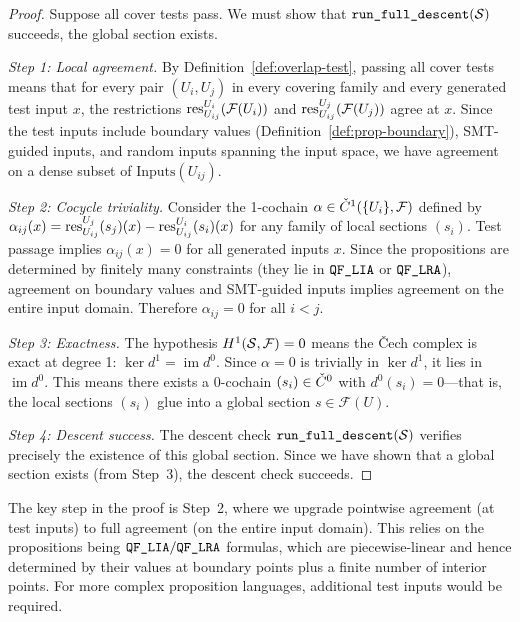 \documentclass[11pt]{article}
\newcommand{\RunDescent}{\texttt{run\_full\_descent}}
\begin{document}
\begin{proof}
Suppose all cover tests pass.  We must show that $\RunDescent(\Site)$
succeeds, \ie the global section exists.

\emph{Step 1: Local agreement.}
By Definition~\ref{def:overlap-test}, passing all cover tests means that
for every pair $(U_i, U_j)$ in every covering family and every generated
test input $x$, the restrictions $\mathrm{res}_{U_{ij}}^{U_i}(\mathcal{F}(U_i))$
and $\mathrm{res}_{U_{ij}}^{U_j}(\mathcal{F}(U_j))$ agree at $x$.  Since the
test inputs include boundary values (Definition~\ref{def:prop-boundary}),
SMT-guided inputs, and random inputs spanning the input space, we have
agreement on a dense subset of $\mathrm{Inputs}(U_{ij})$.

\emph{Step 2: Cocycle triviality.}
Consider the 1-cochain $\alpha \in \check{C}^1(\{U_i\}, \mathcal{F})$ defined
by $\alpha_{ij}(x) = \mathrm{res}_{U_{ij}}^{U_j}(s_j)(x) -
\mathrm{res}_{U_{ij}}^{U_i}(s_i)(x)$ for any family of local sections $(s_i)$.
Test passage implies $\alpha_{ij}(x) = 0$ for all generated inputs $x$.
Since the propositions are determined by finitely many constraints
(they lie in $\texttt{QF\_LIA}$ or $\texttt{QF\_LRA}$), agreement on boundary values and
SMT-guided inputs implies agreement on the entire input domain.  Therefore
$\alpha_{ij} = 0$ for all $i < j$.

\emph{Step 3: Exactness.}
The hypothesis $H^{1}(\mathcal{S}, \mathcal{F}) = 0$ means the \v{C}ech
complex is exact at degree 1: $\ker d^1 = \operatorname{im} d^0$.
Since $\alpha = 0$ is trivially in $\ker d^1$, it lies in
$\operatorname{im} d^0$.  This means there exists a 0-cochain
$(s_i) \in \check{C}^0$ with $d^0(s_i) = 0$---that is, the local sections
$(s_i)$ glue into a global section $s \in \mathcal{F}(U)$.

\emph{Step 4: Descent success.}
The descent check $\RunDescent(\Site)$ verifies precisely the existence
of this global section.  Since we have shown that a global section exists
(from Step~3), the descent check succeeds.
\end{proof}

\begin{remark}\label{rem:test-density}
The key step in the proof is Step~2, where we upgrade pointwise agreement
(at test inputs) to full agreement (on the entire input domain).  This
relies on the propositions being $\texttt{QF\_LIA}/\texttt{QF\_LRA}$ formulas, which are
piecewise-linear and hence determined by their values at boundary points
plus a finite number of interior points.  For more complex proposition
languages, additional test inputs would be required.
\end{remark}
\end{document}
